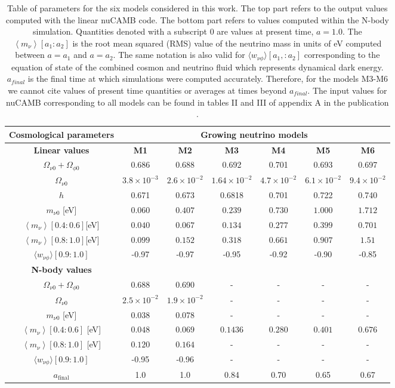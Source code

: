 \begin{table}
\centering{}%
\small
\begin{tabular}{|c|c|c|c|c|c|c|}
\hline 
\textbf{Cosmological parameters}  & \multicolumn{6}{c|}{\textbf{Growing neutrino models}}\tabularnewline
\hline 
\textbf{{Linear values} }  & \textbf{{M1} }  & \textbf{{M2} }  & \textbf{{M3} }  & \textbf{{M4} }  & \textbf{{M5} }  & \textbf{{M6}}\tabularnewline
\hline 
\hline 
$\Omega_{\nu0}+\Omega_{\phi0}$  & 0.686  & 0.688  & 0.692  & 0.701  & 0.693  & 0.697\tabularnewline
\hline 
$\Omega_{\nu0}$  & $3.8\times10^{-3}$  & $2.6\times10^{-2}$  & $1.64\times10^{-2}$  & $4.7\times10^{-2}$  & $6.1\times10^{-2}$  & $9.4\times10^{-2}$\tabularnewline
\hline 
$h$  & 0.671  & 0.673  & 0.6818  & 0.701  & 0.722  & 0.740\tabularnewline
\hline 
$m_{\nu0}$ {[}eV{]}  & $0.060$  & $0.407$  & $0.239$  & $0.730$  & $1.000$  & $1.712$\tabularnewline
\hline 
$\left\langle m_{\nu}\right\rangle $$[0.4:0.6]${[}eV{]}  & $0.040$  & $0.067$  & $0.134$  & $0.277$  & $0.399$  & $0.701$\tabularnewline
\hline 
$\left\langle m_{\nu}\right\rangle $$[0.8:1.0]${[}eV{]}  & $0.099$  & $0.152$  & $0.318$  & $0.661$  & $0.907$  & $1.51$\tabularnewline
\hline 
$\langle w_{\nu\phi}\rangle[0.9:1.0]$  & -0.97  & -0.97  & -0.95  & -0.92  & -0.90  & -0.85\tabularnewline
\hline 
\hline 
\textbf{{N-body values} }  &  &  &  &  &  & \tabularnewline
\hline 
\hline 
$\Omega_{\nu0}+\Omega_{\phi0}$  & 0.688  & 0.690  & -  & -  & -  & -\tabularnewline
\hline 
$\Omega_{\nu0}$  & $2.5\times10^{-2}$  & $1.9\times10^{-2}$  & -  & -  & -  & -\tabularnewline
\hline 
$m_{\nu0}$ {[}eV{]}  & 0.038  & 0.078  & -  & -  & -  & -\tabularnewline
\hline 
$\left\langle m_{\nu}\right\rangle [0.4:0.6]$ {[}eV{]}  & $0.048$  & $0.069$  & $0.1436$  & $0.280$  & $0.401$  & $0.676$\tabularnewline
\hline 
$\left\langle m_{\nu}\right\rangle [0.8:1.0]$ {[}eV{]}  & $0.120$  & $0.164$  & -  & -  & -  & -\tabularnewline
\hline 
$\langle w_{\nu\phi}\rangle[0.9:1.0]$  & -0.95  & -0.96  & -  & -  & -  & -\tabularnewline
\hline 
$a_{\text{final}}$  & 1.0  & 1.0  & 0.84  & 0.70  & 0.65  & 0.67\tabularnewline
\hline 
\end{tabular}
\small
\caption[Parameters for the GNQ models considered in this work.]{\label{tab:simus-params} Table of parameters for the six models considered
in this work. The top part refers to the output values computed with
the linear nuCAMB code. The bottom part refers to values computed
within the N-body simulation. Quantities denoted with a subscript
$0$ are values at present time, $a=1.0.$ The $\left\langle m_{\nu}\right\rangle [a_{1}:a_{2}]$
is the root mean squared (RMS) value of the neutrino mass in units
of eV computed between $a=a_{1}$ and $a=a_{2}$. The same notation
is also valid for $\langle w_{\nu\phi}\rangle[a_{1},:a_{2}]$ corresponding
to the equation of state of the combined cosmon and neutrino fluid
which represents dynamical dark energy. $a_{final}$ is the final
time at which simulations were computed accurately. Therefore, for
the models M3-M6 we cannot cite values of present time quantities
or averages at times beyond $a_{final}$. The input values for nuCAMB
corresponding to all models can be found in tables II and III
of appendix A in the publication \cite{casas_dynamics_2016}.}
\end{table}
